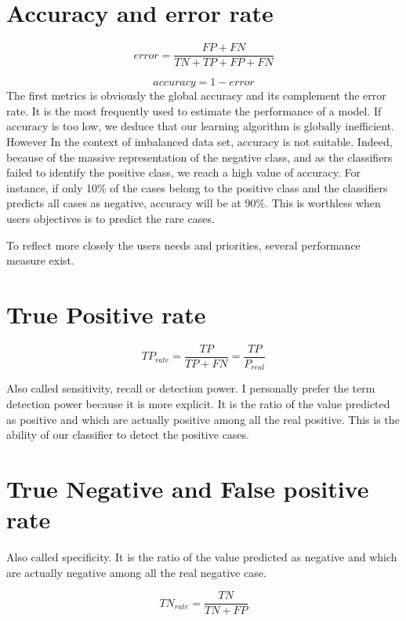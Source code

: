 \documentclass[
]{report}
\begin{document}
\hypertarget{accuracy-and-error-rate}{%
\section{Accuracy and error rate}\label{accuracy-and-error-rate}}

\[error = \frac{FP + FN}{TN+TP+FP+FN}\]

\[accuracy = 1 - error\]
The first metrics is obviously the global accuracy and its complement the error rate. It is the most frequently used to estimate the performance of a model. If accuracy is too low, we deduce that our learning algorithm is globally inefficient. However In the context of imbalanced data set, accuracy is not suitable. Indeed, because of the massive representation of the negative class, and as the classifiers failed to identify the positive class, we reach a high value of accuracy. For instance, if only 10\% of the cases belong to the positive class and the classifiers predicts all cases as negative, accuracy will be at 90\%.
This is worthless when users objectives is to predict the rare cases.

To reflect more closely the users needs and priorities, several performance measure exist.

\hypertarget{true-positive-rate}{%
\section{True Positive rate}\label{true-positive-rate}}

\[TP_{rate} = \frac{TP}{TP+FN} = \frac{TP}{P_{real}}\]

Also called sensitivity, recall or detection power. I personally prefer the term detection power because it is more explicit. It is the ratio of the value predicted as positive and which are actually positive among all the real positive. This is the ability of our classifier to detect the positive cases.

\hypertarget{true-negative-and-false-positive-rate}{%
\section{True Negative and False positive rate}\label{true-negative-and-false-positive-rate}}

Also called specificity. It is the ratio of the value predicted as negative and which are actually negative among all the real negative case.

\[TN_{rate} = \frac{TN}{TN+FP}\]
\end{document}

